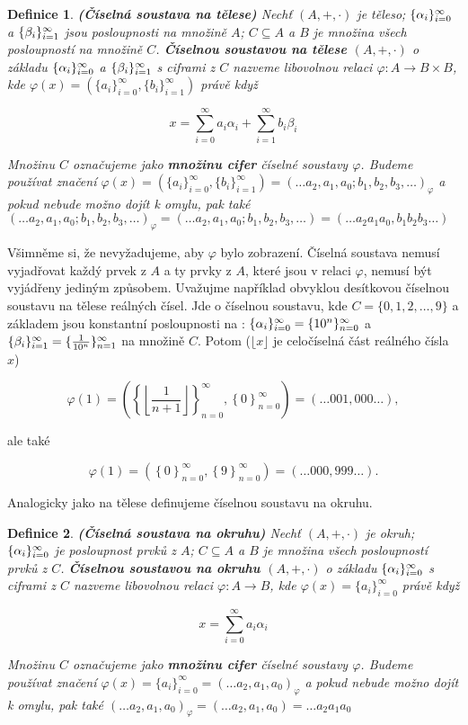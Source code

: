 \documentclass[12pt]{book}
\newtheorem{definice}{Definice}
\begin{document}
\begin{definice} \textbf{(Číselná soustava na tělese)}
	Nechť $(A,+,\cdot)$ je těleso; $\{\alpha_i\}_{i=0}^{\infty}$ a $\{\beta_i\}_{i=1}^{\infty}$ jsou posloupnosti na množině $A$; $C\subseteq A$ a $B$ je množina všech posloupností na množině $C$.
	\textbf{Číselnou soustavou na tělese $(A,+,\cdot)$} o základu $\{\alpha_i\}_{i=0}^{\infty}$ a $\{\beta_i\}_{i=1}^{\infty}$ s ciframi z $C$ nazveme libovolnou relaci $\varphi : A \rightarrow B\times B$, kde 	$\varphi(x)=\left(\{a_{i}\}_{i=0}^{\infty},\{b_{i}\}_{i=1}^{\infty}\right)$ právě když
	
	$$x = \sum_{i=0}^{\infty} a_{i}\alpha_{i} + \sum_{i=1}^{\infty} b_{i}\beta_{i}$$
	
	Množinu $C$ označujeme jako \textbf{množinu cifer} číselné soustavy $\varphi$. Budeme používat značení $\varphi(x) = \left(\{a_{i}\}_{i=0}^{\infty},\{b_{i}\}_{i=1}^{\infty}\right) = (\dots a_2,a_1,a_0;b_1, b_2, b_3, \dots)_{\varphi}$ a pokud nebude možno dojít k omylu, pak také $(\dots a_2,a_1,a_0;b_1, b_2, b_3, \dots)_{\varphi} = (\dots a_2,a_1,a_0;b_1, b_2, b_3, \dots) = (\dots a_2a_1a_0,b_1 b_2 b_3 \dots)$
\end{definice}

Všimněme si, že nevyžadujeme, aby $\varphi$ bylo zobrazení. Číselná soustava nemusí vyjadřovat každý prvek z $A$ a ty prvky z $A$, které jsou v relaci $\varphi$, nemusí být vyjádřeny jediným způsobem. Uvažujme například obvyklou desítkovou číselnou soustavu na tělese reálných čísel. Jde o číselnou soustavu, kde $C = \{0, 1, 2, \dots, 9\}$ a základem jsou konstantní posloupnosti na : $\{\alpha_i\}_{i=0}^{\infty} = \{10^n\}_{n = 0}^{\infty}$ a $\{\beta_i\}_{i=1}^{\infty} = \{\frac{1}{10^n}\}_{n = 1}^{\infty}$ na množině $C$. Potom ($\lfloor x\rfloor$ je celočíselná část reálného čísla $x$)  

$$\varphi(1) = \left(  \left\{ \left\lfloor\frac{1}{n+1} \right\rfloor \right\}_{n = 0}^{\infty} , \left\{ 0 \right\}_{n = 0}^{\infty} \right) = \left(\dots 001,000 \dots \right),$$

ale také

$$\varphi(1) = \left(  \left\{ 0 \right\}_{n = 0}^{\infty} , \left\{ 9 \right\}_{n = 0}^{\infty} \right) = \left(\dots 000,999 \dots \right).$$


Analogicky jako na tělese definujeme číselnou soustavu na okruhu.


\begin{definice} \textbf{(Číselná soustava na okruhu)}
	Nechť $(A,+,\cdot)$ je okruh; $\{\alpha_i\}_{i=0}^{\infty}$ je posloupnost prvků z $A$; $C\subseteq A$ a $B$ je množina všech posloupností prvků z $C$.
	\textbf{Číselnou soustavou na okruhu $(A,+,\cdot)$} o základu $\{\alpha_i\}_{i=0}^{\infty}$ s ciframi z $C$ nazveme libovolnou relaci $\varphi : A \rightarrow B$, kde 	$\varphi(x)= \{a_{i}\}_{i=0}^{\infty}$ právě když
	
	$$x = \sum_{i=0}^{\infty} a_{i}\alpha_{i}$$
	
	Množinu $C$ označujeme jako \textbf{množinu cifer} číselné soustavy $\varphi$. Budeme používat značení $\varphi(x) = \{a_{i}\}_{i=0}^{\infty} = (\dots a_2,a_1,a_0)_{\varphi}$ a pokud nebude možno dojít k omylu, pak také $(\dots a_2,a_1,a_0)_{\varphi} = (\dots a_2,a_1,a_0) = \dots a_2a_1a_0$
\end{definice}
\end{document}
